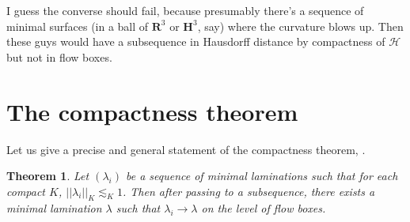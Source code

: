 \documentclass[reqno,10pt]{amsart}
\newcommand{\RR}{\mathbf{R}}
\newcommand{\Hyp}{\mathbf H}
\newtheorem{theorem}{Theorem}[section]
\theoremstyle{definition}
\numberwithin{equation}{section}
\begin{document}
I guess the converse should fail, because presumably there's a sequence of minimal surfaces (in a ball of $\RR^3$ or $\Hyp^3$, say) where the curvature blows up.
Then these guys would have a subsequence in Hausdorff distance by compactness of $\mathscr H$ but not in flow boxes.


\section{The compactness theorem}
Let us give a precise and general statement of the compactness theorem, \cite[Proposition B.1]{ColdingMinicozziIV}.

\begin{theorem}
Let $(\lambda_i)$ be a sequence of minimal laminations such that for each compact $K$, $||\lambda_i||_K \lesssim_K 1$.
Then after passing to a subsequence, there exists a minimal lamination $\lambda$ such that $\lambda_i \to \lambda$ on the level of flow boxes.
\end{theorem}
\end{document}
